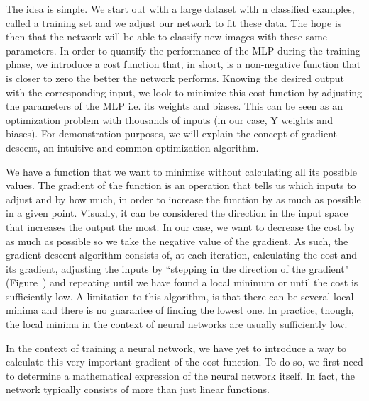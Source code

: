 \startsubsection[title=Training phase]
The idea is simple. We start out with a large dataset with n classified examples, called a training set and we adjust our network to fit these data.
The hope is then that the network will be able to classify new images with these same parameters.
In order to quantify the performance of the MLP during the training phase, we introduce a cost function that, in short, is a non-negative function that is closer to zero the better the network performs.
Knowing the desired output with the corresponding input, we look to minimize this cost function by adjusting the parameters of the MLP i.e. its weights and biases.
This can be seen as an optimization problem with thousands of inputs (in our case, Y weights and biases).
For demonstration purposes, we will explain the concept of gradient descent, an intuitive and common optimization algorithm.
\stopsubsection

\startsubsection[title=Optimization using gradient descent]
We have a function that we want to minimize without calculating all its possible values.
The gradient of the function is an operation that tells us which inputs to adjust and by how much, in order to increase the function by as much as possible in a given point.
Visually, it can be considered the direction in the input space that increases the output the most.
In our case, we want to decrease the cost by as much as possible so we take the negative value of the gradient.
As such, the gradient descent algorithm consists of, at each iteration, calculating the cost and its gradient, adjusting the inputs by “stepping in the direction of the gradient" (Figure~\in[gradient]) and repeating until we have found a local minimum or until the cost is sufficiently low.
A limitation to this algorithm, is that there can be several local minima and there is no guarantee of finding the lowest one.
In practice, though, the local minima in the context of neural networks are usually sufficiently low.

\startplacefigure[reference=gradient,
                  location=bottom,
                  title={A visual}]
\stopplacefigure

In the context of training a neural network, we have yet to introduce a way to calculate this very important gradient of the cost function. 
To do so, we first need to determine a mathematical expression of the neural network itself.
In fact, the network typically consists of more than just linear functions.
\stopsubsection


